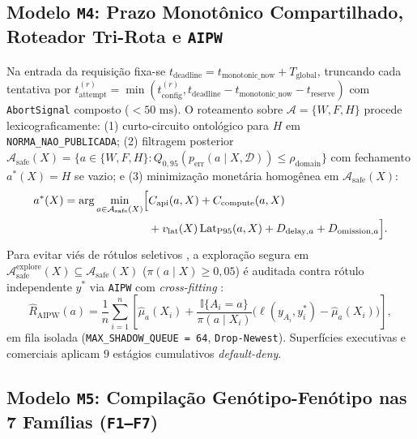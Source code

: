 \documentclass[10pt,twocolumn]{article}
\begin{document}
\subsection{Modelo \texttt{M4}: Prazo Monot\^onico Compartilhado, Roteador Tri-Rota e \texttt{AIPW}}

Na entrada da requisi\c{c}\~ao fixa-se $t_{\mathrm{deadline}} = t_{\mathrm{monotonic\_now}} + T_{\mathrm{global}}$, truncando cada tentativa por $t_{\mathrm{attempt}}^{(r)} = \min(t_{\mathrm{config}}^{(r)}, t_{\mathrm{deadline}} - t_{\mathrm{monotonic\_now}} - t_{\mathrm{reserve}})$ com \texttt{AbortSignal} composto ($<50\text{ ms}$). O roteamento sobre $\mathcal{A}=\{W,F,H\}$ procede lexicograficamente: (1) curto-circuito ontol\'ogico para $H$ em \texttt{NORMA\_NAO\_PUBLICADA}; (2) filtragem posterior $\mathcal{A}_{\mathrm{safe}}(X) = \{a \in \{W,F,H\} : Q_{0,95}(p_{\mathrm{err}}(a \mid X,\mathcal{D})) \le \rho_{\mathrm{domain}}\}$ com fechamento $a^*(X)=H$ se vazio; e (3) minimiza\c{c}\~ao monet\'aria homog\^enea em $\mathcal{A}_{\mathrm{safe}}(X)$:
\begin{equation}
\begin{aligned}
a^*(X) = \arg\min_{a \in \mathcal{A}_{\mathrm{safe}}(X)} \Bigl[&C_{\mathrm{api}}(a,X) + C_{\mathrm{compute}}(a,X) \\
&+ v_{\mathrm{lat}}(X)\operatorname{Lat}_{\mathrm{P95}}(a,X) + D_{\mathrm{delay},a} + D_{\mathrm{omission},a}\Bigr].
\end{aligned}
\end{equation}
Para evitar vi\'es de r\'otulos seletivos \cite{lakkaraju2017selective}, a explora\c{c}\~ao segura em $\mathcal{A}_{\mathrm{safe}}^{\mathrm{explore}}(X) \subseteq \mathcal{A}_{\mathrm{safe}}(X)$ ($\pi(a\mid X)\ge 0,05$) \'e auditada contra r\'otulo independente $y^*$ via \texttt{AIPW} com \emph{cross-fitting} \cite{robins1994estimation}:
\begin{equation}
\widehat{R}_{\mathrm{AIPW}}(a) = \frac{1}{n}\sum_{i=1}^{n}\left[\hat{\mu}_a(X_i) + \frac{\mathbb{I}\{A_i=a\}}{\pi(a\mid X_i)}\bigl(\ell(y_{A_i},y_i^*) - \hat{\mu}_a(X_i)\bigr)\right],
\end{equation}
em fila isolada (\texttt{MAX\_SHADOW\_QUEUE = 64}, \texttt{Drop-Newest}). Superf\'icies executivas e comerciais aplicam $9$ est\'agios cumulativos \emph{default-deny}.

\subsection{Modelo \texttt{M5}: Compila\c{c}\~ao Gen\'otipo-Fen\'otipo nas 7 Fam\'ilias (\texttt{F1--F7})}
\end{document}
